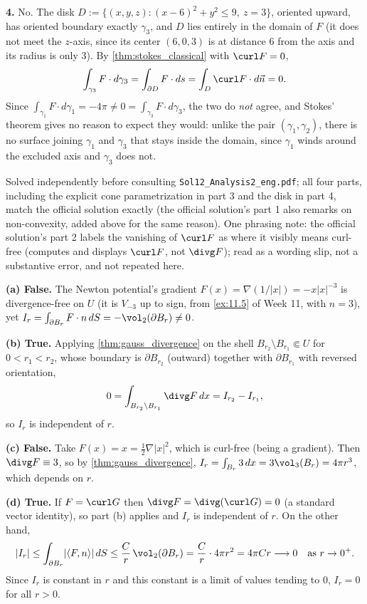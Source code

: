 \begin{exercisesolution}
\textbf{4.} No. The disk $D := \{(x,y,z) : (x-6)^2+y^2 \leq 9,\ z=3\}$, oriented upward, has
oriented boundary exactly $\gamma_3$, and $D$ lies entirely in the domain of $F$ (it does not
meet the $z$-axis, since its center $(6,0,3)$ is at distance $6$ from the axis and its radius
is only $3$). By \cref{thm:stokes_classical} with $\curl F=0$,
\[\int_{\gamma_3} F\cdot d\gamma_3 = \int_{\partial D} F\cdot ds = \int_D \curl F\cdot d\vec n
  = 0.\]
Since $\int_{\gamma_1} F\cdot d\gamma_1 = -4\pi \neq 0 = \int_{\gamma_3} F\cdot d\gamma_3$, the
two do \emph{not} agree, and Stokes' theorem gives no reason to expect they would: unlike the
pair $(\gamma_1,\gamma_2)$, there is no surface joining $\gamma_1$ and $\gamma_3$ that stays
inside the domain, since $\gamma_1$ winds around the excluded axis and $\gamma_3$ does not.
\end{exercisesolution}

\begin{ainote}
Solved independently before consulting \texttt{Sol12\_Analysis2\_eng.pdf}; all four parts,
including the explicit cone parametrization in part 3 and the disk in part 4, match the
official solution exactly (the official solution's part 1 also remarks on non-convexity, added
above for the same reason). One phrasing note: the official solution's part 2 labels the
vanishing of $\curl F$ as  where it visibly means curl-free
(computes and displays $\curl F$, not $\divg F$); read as a wording slip, not a substantive
error, and not repeated here.
\end{ainote}

\begin{exercisesolution}
\textbf{(a) False.} The Newton potential's gradient $F(x) = \nabla(1/\lvert x\rvert) =
-x\lvert x\rvert^{-3}$ is divergence-free on $U$ (it is $V_{-3}$ up to sign, from
\cref{ex:11.5} of Week 11, with $n=3$), yet $I_r = \int_{\partial B_r} F\cdot n\,dS =
-\vol_2(\partial B_r) \neq 0$.

\textbf{(b) True.} Applying \cref{thm:gauss_divergence} on the shell $B_{r_2}\setminus
B_{r_1} \Subset U$ for $0<r_1<r_2$, whose boundary is $\partial B_{r_2}$ (outward) together
with $\partial B_{r_1}$ with reversed orientation,
\[0 = \int_{B_{r_2}\setminus B_{r_1}} \divg F\,dx = I_{r_2} - I_{r_1},\]
so $I_r$ is independent of $r$.

\textbf{(c) False.} Take $F(x) = x = \tfrac12\nabla\lvert x\rvert^2$, which is curl-free
(being a gradient). Then $\divg F \equiv 3$, so by \cref{thm:gauss_divergence}, $I_r =
\int_{B_r} 3\,dx = 3\vol_3(B_r) = 4\pi r^3$, which depends on $r$.

\textbf{(d) True.} If $F = \curl G$ then $\divg F = \divg(\curl G) = 0$ (a standard vector
identity), so part (b) applies and $I_r$ is independent of $r$. On the other hand,
\[\lvert I_r\rvert \leq \int_{\partial B_r} \lvert\langle F,n\rangle\rvert\,dS \leq
  \frac{C}{r}\,\vol_2(\partial B_r) = \frac{C}{r}\cdot4\pi r^2 = 4\pi C r \longrightarrow 0
  \quad\text{as } r\to0^+.\]
Since $I_r$ is constant in $r$ and this constant is a limit of values tending to $0$, $I_r=0$
for all $r>0$.
\end{exercisesolution}

